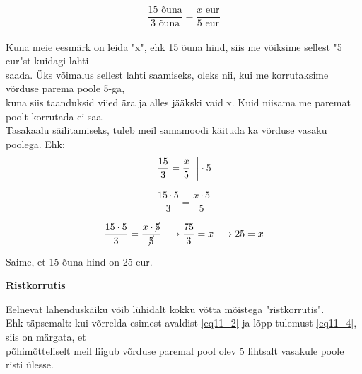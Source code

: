 \begin{center}
{{{\begin{flushleft}
\[ \dfrac{15 \text{ õuna}}{3 \text{ õuna}}=\dfrac{x \text{ eur}}{5 \text{ eur}}   \] \\

\hspace{5mm} Kuna meie eesmärk on leida "x", ehk 15 õuna hind, siis me võiksime sellest "5 eur"st kuidagi lahti\\ \hspace{5mm} saada. Üks võimalus sellest lahti saamiseks, oleks nii, kui me korrutaksime võrduse parema poole 5-ga,\\ \hspace{5mm} kuna siis taanduksid viied ära ja alles jääkski vaid x. Kuid niisama me paremat poolt korrutada ei saa.\\ \hspace{5mm} Tasakaalu säilitamiseks, tuleb meil samamoodi käituda ka võrduse vasaku poolega. Ehk:\\

\begin{equation}
\left.\dfrac{15 }{3 }=\dfrac{x }{5 } \hspace{2mm} \right| \cdot 5
\label{eq11_2}
\end{equation}

\begin{equation}
\dfrac{15 \cdot 5}{3 }=\dfrac{x  \cdot 5}{5 }
\label{eq11_3}
\end{equation}

\begin{equation}
 \dfrac{15 \cdot 5 }{3 }=\dfrac{x \cdot \cancel{5}}{\cancel{5} } \longrightarrow \dfrac{75}{3} = x \longrightarrow 25 = x
 \label{eq11_4}
\end{equation}

\hspace{5mm} Saime, et 15 õuna hind on 25 eur.

\vspace{5mm}

\hspace{5mm} \textbf{\underline{Ristkorrutis}}

\hspace{5mm} Eelnevat lahenduskäiku võib lühidalt kokku võtta mõistega "ristkorrutis".\\
\hspace{5mm} Ehk täpsemalt: kui võrrelda esimest avaldist \ref{eq11_2} ja lõpp tulemust \ref{eq11_4}, siis on märgata, et \\ \hspace{5mm} põhimõtteliselt meil liigub võrduse paremal pool olev 5 lihtsalt vasakule poole risti ülesse.

\end{flushleft}
}}}
\end{center}

